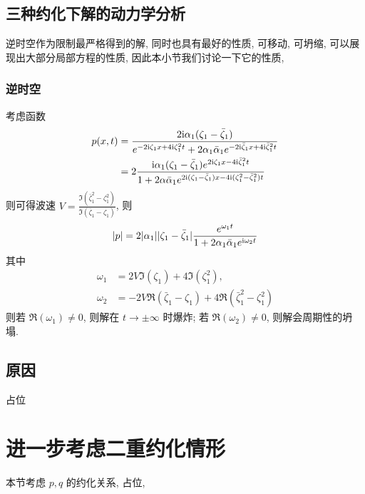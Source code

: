 \subsection{三种约化下解的动力学分析}
逆时空作为限制最严格得到的解, 同时也具有最好的性质, 可移动, 可坍缩, 可以展现出大部分局部方程的性质, 因此本小节我们讨论一下它的性质,
\subsubsection{逆时空}
考虑函数
\begin{equation}
    \begin{aligned}
        p(x,t) & = \frac{2 \mathrm{i} \alpha_{1} (\zeta_{1} - \bar{\zeta}_{1})}{e^{-2 \mathrm{i} \zeta_{1} x + 4 \mathrm{i} \zeta_{1}^{2} t} + 2 \alpha_{1} \bar{\alpha}_{1} e^{-2 \mathrm{i} \bar{\zeta}_{1} x + 4 \mathrm{i} \bar{\zeta}_{1}^{2} t}}                               \\
               & = 2 \frac{\mathrm{i} \alpha_{1} (\zeta_{1} - \bar{\zeta}_{1}) e^{2\mathrm{i} \zeta_{1} x - 4 \mathrm{i} \bar{\zeta}_{1}^{2}t}}{1+ 2\alpha \bar{\alpha}_{1} e^{2 \mathrm{i} (\zeta_{1} - \bar{\zeta}_{1}) x - 4 \mathrm{i} (\zeta_{1}^{2} - \bar{\zeta}_{1}^{2}) t}}
    \end{aligned}
\end{equation}
则可得波速 $ V = \frac{\Im(\bar{\zeta}_{1}^{2} - \zeta_{1}^{2})}{\Im(\bar{\zeta}_{1} - \zeta_{1})} $, 则
\begin{equation}
    | p | = 2 |\alpha_{1} | |\zeta_{1} - \bar{\zeta}_{1} | \frac{e^{\omega_{1} t}}{1+2\alpha_{1}\bar{\alpha}_{1}e^{\mathrm{i} \omega_{2} t}}
\end{equation}
其中
\begin{align}
    \omega_{1} & = 2V \Im(\zeta_{1}) + 4 \Im(\zeta_{1}^{2}),                                         \\
    \omega_{2} & = -2V \Re(\bar{\zeta}_{1} - \zeta_{1}) + 4 \Re(\bar{\zeta}_{1}^{2} - \zeta_{1}^{2})
\end{align}
则若 $ \Re(\omega_{1}) \neq 0 $, 则解在 $ t \to \pm \infty $ 时爆炸; 若 $ \Re(\omega_{2}) \neq 0 $, 则解会周期性的坍塌.
\subsection{原因}
占位
\section{进一步考虑二重约化情形}
本节考虑 $ p, q $ 的约化关系, 占位,
